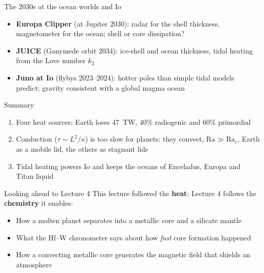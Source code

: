 \documentclass[aspectratio=169, 11pt]{beamer}
\begin{document}
\begin{frame}{The 2030s at the ocean worlds and Io}
  \begin{itemize}\setlength\itemsep{4pt}
    \item \textbf{Europa Clipper} (at Jupiter 2030): radar for the shell thickness, magnetometer for the ocean; shell or core dissipation?
    \item \textbf{JUICE} (Ganymede orbit 2034): ice-shell and ocean thickness, tidal heating from the Love number $k_2$
    \item \textbf{Juno at Io} (flybys 2023--2024): hotter poles than simple tidal models predict; gravity consistent with a global magma ocean
  \end{itemize}
  \vskip6pt
\end{frame}

\begin{frame}{Summary}
  \begin{enumerate}\setlength\itemsep{6pt}
    \item Four heat sources; Earth loses 47~TW, 40\% radiogenic and 60\% primordial
    \item Conduction ($\tau \sim L^2/\kappa$) is too slow for planets: they convect, $\mathrm{Ra} \gg \mathrm{Ra}_c$, Earth as a mobile lid, the others as stagnant lids
    \item Tidal heating powers Io and keeps the oceans of Enceladus, Europa and Titan liquid
  \end{enumerate}
\end{frame}

\begin{frame}{Looking ahead to Lecture 4}
  This lecture followed the \textbf{heat}; Lecture 4 follows the \textbf{chemistry} it enables:
  \vskip6pt
  \begin{itemize}
    \item How a molten planet separates into a metallic core and a silicate mantle
    \item What the Hf--W chronometer says about how \emph{fast} core formation happened
    \item How a convecting metallic core generates the magnetic field that shields an atmosphere
  \end{itemize}
  \vskip6pt
\end{frame}
\end{document}
